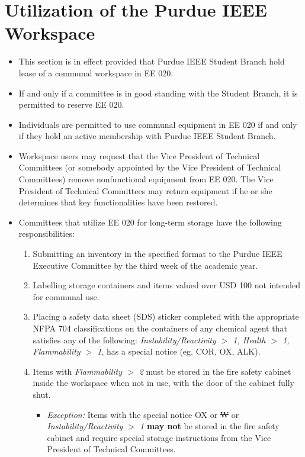 \documentclass[12pt]{constitution}
\begin{document}
\section{Utilization of the Purdue IEEE Workspace}
\label{sec:tech_workspace}
\begin{itemize}
    \item This section is in effect provided that Purdue IEEE Student Branch hold lease of a communal workspace in EE 020.
    \item If and only if a committee is in good standing with the Student Branch, it is permitted to reserve EE 020.
    \item Individuals are permitted to use communal equipment in EE 020 if and only if they hold an active membership with Purdue IEEE Student Branch.
    \item Workspace users may request that the Vice President of Technical Committees (or somebody appointed by the Vice President of Technical Committees) remove nonfunctional equipment from EE 020. The Vice President of Technical Committees may return equipment if he or she determines that key functionalities have been restored.
    \item Committees that utilize EE 020 for long-term storage have the following responsibilities:
    \begin{enumerate}
        \item Submitting an inventory in the specified format to the Purdue IEEE Executive Committee by the third week of the academic year.
        \item Labelling storage containers and items valued over USD 100 not intended for communal use.
        \item Placing a safety data sheet (SDS) sticker completed with the appropriate NFPA 704 classifications on the containers of any chemical agent that satisfies any of the following: \emph{Instability/Reactivity $>$ 1, Health $>$ 1, Flammability $>$ 1}, has a special notice (eg. COR, OX, ALK).
        \item Items with \emph{Flammability $>$ 2} must be stored in the fire safety cabinet inside the workspace when not in use, with the door of the cabinet fully shut.
        \begin{itemize}
            \item \emph{Exception:} Items with the special notice OX or \st{W} or \emph{Instability/Reactivity $>$ 1} \textbf{may not} be stored in the fire safety cabinet and require special storage instructions from the Vice President of Technical Committees. 

\end{itemize}
\end{enumerate}
\end{itemize}
\end{document}
